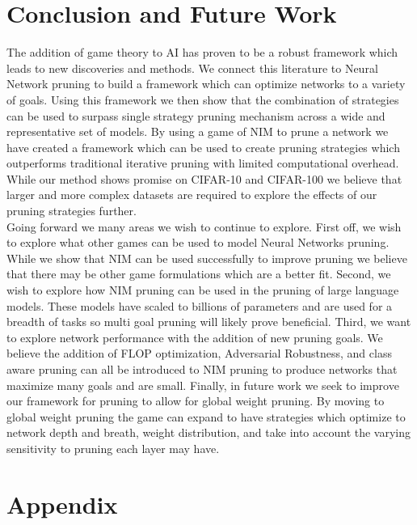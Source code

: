 \documentclass[runningheads]{llncs}
\begin{document}
\section{Conclusion and Future Work}
The addition of game theory to AI has proven to be a robust framework which leads to new discoveries and methods. We connect this literature to Neural Network pruning to build a framework which can optimize networks to a variety of goals. Using this framework we then show that the combination of strategies can be used to surpass single strategy pruning mechanism across a wide and representative set of models. By using a game of NIM to prune a network we have created a framework which can be used to create pruning strategies which outperforms traditional iterative pruning with limited computational overhead. While our method shows promise on CIFAR-10 and CIFAR-100 we believe that larger and more complex datasets are required to explore the effects of our pruning strategies further. \\
Going forward we many areas we wish to continue to explore. First off, we wish to explore what other games can be used to model Neural Networks pruning. While we show that NIM can be used successfully to improve pruning we believe that there may be other game formulations which are a better fit. Second, we wish to explore how NIM pruning can be used in the pruning of large language models. These models have scaled to billions of parameters and are used for a breadth of tasks so multi goal pruning will likely prove beneficial. Third, we want to explore network performance with the addition of new pruning goals. We believe the addition of FLOP optimization, Adversarial Robustness, and class aware pruning can all be introduced to NIM pruning to produce networks that maximize many goals and are small. Finally, in future work we seek to improve our framework for pruning to allow for global weight pruning. By moving to global weight pruning the game can expand to have strategies which optimize to network depth and breath, weight distribution, and take into account the varying sensitivity to pruning each layer may have. 


\section{Appendix}
\end{document}
